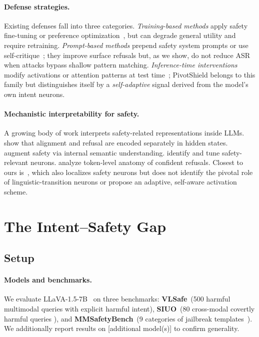 \documentclass{article}
\newcommand{\method}{PivotShield\xspace}
\begin{document}
\paragraph{Defense strategies.}
Existing defenses fall into three categories.
\emph{Training-based methods} apply safety fine-tuning
\citep{PLACEHOLDER_safety_ft_verify} or preference
optimization~\citep{PLACEHOLDER_rlhf_safety_verify}, but can
degrade general utility and require retraining.
\emph{Prompt-based methods} prepend safety system prompts or use
self-critique~\citep{PLACEHOLDER_selfcritique_verify,
PLACEHOLDER_llava_guard_verify}; they improve surface refusals
but, as we show, do not reduce ASR when attacks bypass shallow
pattern matching.
\emph{Inference-time interventions} modify activations or
attention patterns at test time~\citep{PLACEHOLDER_iti_verify,
PLACEHOLDER_safeptr_verify}; \method belongs to this family but
distinguishes itself by a \emph{self-adaptive} signal derived
from the model's own intent neurons.

\paragraph{Mechanistic interpretability for safety.}
A growing body of work interprets safety-related representations
inside LLMs.
\citet{PLACEHOLDER_alignment_jailbreak_verify} show that
alignment and refusal are encoded separately in hidden states.
\citet{PLACEHOLDER_selfaware_vlm_verify} augment safety via
internal semantic understanding.
\citet{PLACEHOLDER_safety_neurons_verify} identify and tune
safety-relevant neurons.
\citet{PLACEHOLDER_safety_instincts_verify} analyze token-level
anatomy of confident refusals.
Closest to ours is~\citet{PLACEHOLDER_safety_neurons_verify},
which also localizes safety neurons but does not identify the
pivotal role of linguistic-transition neurons or propose an
adaptive, self-aware activation scheme.

\section{The Intent--Safety Gap}
\label{sec:gap}

\subsection{Setup}

\paragraph{Models and benchmarks.}
We evaluate LLaVA-1.5-7B~\citep{PLACEHOLDER_llava_verify} on
three benchmarks:
\textbf{VLSafe}~(500 harmful multimodal queries with explicit
harmful intent),
\textbf{SIUO}~(80 cross-modal covertly harmful queries
\citep{PLACEHOLDER_siuo_verify}), and
\textbf{MMSafetyBench}~(9 categories of jailbreak
templates~\citep{PLACEHOLDER_mmsafetybench_verify}).
We additionally report results on [additional model(s)] to
confirm generality.
\end{document}
